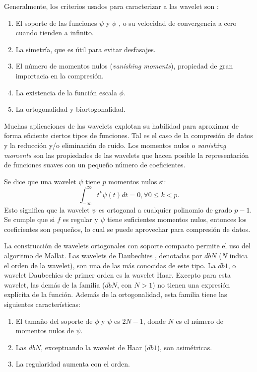 Generalmente, los criterios usados para caracterizar a las wavelet son \cite{misiti2007wavelets}:
\begin{enumerate}
	\item El soporte de las funciones $\psi$ y $\phi$ , o su velocidad de convergencia a  cero cuando tienden a 
		infinito.
	\item La simetría, que es útil para evitar desfasajes.
	\item El número de momentos nulos (\textit{vanishing moments}), propiedad de gran importacia en la compresión.
	\item La existencia de la función escala $\phi$.
	\item La ortogonalidad y biortogonalidad.
\end{enumerate}

Muchas aplicaciones de las wavelets explotan su habilidad para aproximar de forma eficiente ciertos tipos de 
funciones. Tal es el caso de la compresión de datos y la reducción y/o eliminación de ruido.
Los momentos nulos o \textit{vanishing moments} son las propiedades de las wavelets que 
hacen posible la representación de funciones suaves con un pequeño número de coeficientes.

Se dice que una wavelet $\psi$ tiene $p$ momentos nulos si:
\begin{equation}
	\int_{-\infty}^{\infty} t^k\psi(t)dt= 0 , \forall 0 \leq k < p.
\end{equation}
Esto significa que la wavelet $\psi$ es ortogonal a cualquier polinomio de grado $p-1$.
Se cumple que si $f$ es regular y $\psi$ tiene suficientes momentos nulos, entonces los coeficientes 
son pequeños, lo cual se puede aprovechar para compresión de datos.

La construcción de wavelets ortogonales con soporte compacto permite el uso del algoritmo de Mallat.
Las  wavelets de Daubechies \cite{daubechies1992}, denotadas por $dbN$ ($N$ indica el orden de la wavelet),
son una de las más conocidas de este tipo. La $db1$, o wavelet Daubechies de primer orden es la wavelet Haar.
Excepto para esta wavelet, las demás de la familia ($dbN$, con $N>1$) no tienen una expresión explícita de la 
función. Además de la ortogonalidad, esta familia tiene las siguientes características:

\begin{enumerate}
	\item El tamaño del soporte de $\phi$ y $\psi$ es $2N-1$, donde $N$ es el número de momentos nulos de $\psi$.
	\item Las $dbN$, exceptuando la wavelet de Haar ($db1$), son asimétricas.
	\item La regularidad aumenta con el orden.
\end{enumerate}

